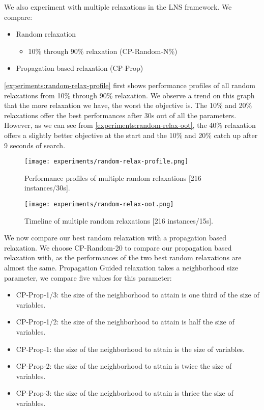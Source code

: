 \documentclass[../../thesis.tex]{subfiles}
\begin{document}
We also experiment with multiple relaxations in the LNS framework. We compare:

\begin{itemize}
  \item Random relaxation 
    \begin{itemize}
      \item 10\% through 90\% relaxation (CP-Random-N\%)
    \end{itemize}
  \item Propagation based relaxation (CP-Prop)
\end{itemize}

\autoref{experiments:random-relax-profile} first shows performance profiles of all random relaxations 
from 10\% through 90\% relaxation. We observe a trend on this graph that the more relaxation we have,
the worst the objective is. The 10\% and 20\% relaxations offer the best performances after 30s out of all 
the parameters. However, as we can see from \autoref{experiments:random-relax-oot}, the 40\% relaxation 
offers a slightly better objective at the start and the 10\% and 20\% catch up after 9 seconds of search.



\begin{figure}
  \centering
  \texttt{[image: experiments/random-relax-profile.png]}
  \caption{Performance profiles of multiple random relaxations [216 instances/30s].}
  \label{experiments:random-relax-profile}
\end{figure}

\begin{figure}
  \centering
  \texttt{[image: experiments/random-relax-oot.png]}
  \caption{Timeline of multiple random relaxations [216 instances/15s].}
  \label{experiments:random-relax-oot}
\end{figure}


We now compare our best random relaxation with a propagation based relaxation.
We choose CP-Random-20 to compare our propagation based relaxation with, as the performances of 
the two best random relaxations are almost the same.
Propagation Guided relaxation takes a neighborhood size parameter, we compare five values for this parameter:

\begin{itemize}
  \item CP-Prop-1/3: the size of the neighborhood to attain is one third of the size of variables.
  \item CP-Prop-1/2: the size of the neighborhood to attain is half the size of variables.
  \item CP-Prop-1: the size of the neighborhood to attain is the size of variables.
  \item CP-Prop-2: the size of the neighborhood to attain is twice the size of variables.
  \item CP-Prop-3: the size of the neighborhood to attain is thrice the size of variables.
\end{itemize}
\end{document}
